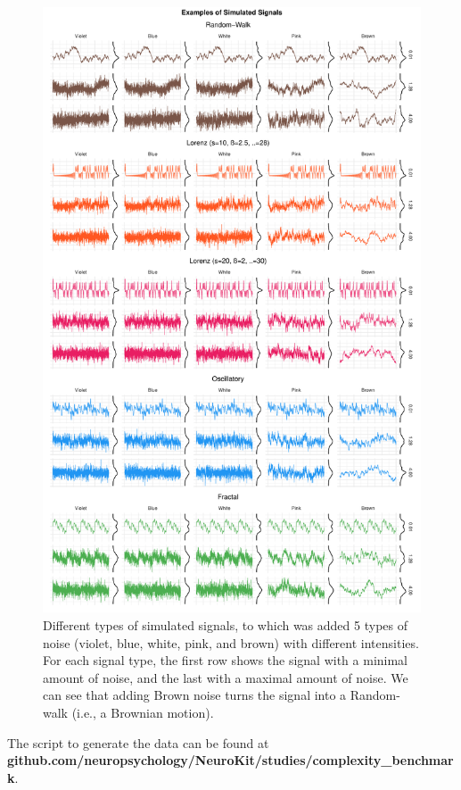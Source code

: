 \documentclass[
  man]{apa6}
\begin{document}
\begin{figure}
\centering
\includegraphics{manuscript_files/figure-latex/signals-1.pdf}
\caption{\label{fig:signals}Different types of simulated signals, to which was added 5 types of noise (violet, blue, white, pink, and brown) with different intensities. For each signal type, the first row shows the signal with a minimal amount of noise, and the last with a maximal amount of noise. We can see that adding Brown noise turns the signal into a Random-walk (i.e., a Brownian motion).}
\end{figure}

The script to generate the data can be found at \textbf{github.com/neuropsychology/NeuroKit/studies/complexity\_benchmark}.
\end{document}
